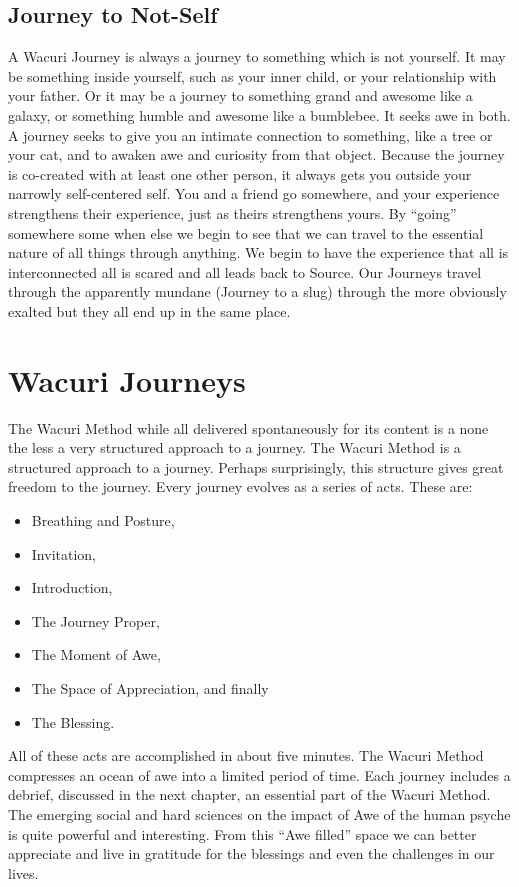 \documentclass[12pt]{book}
\begin{document}
\section{Journey to Not-Self}

A Wacuri Journey is always a journey to something which is not yourself.
It may be something inside yourself, such as your inner child, or your relationship with your father.
Or it may be a journey to something grand and awesome like a galaxy, or something humble and awesome like a bumblebee.
It seeks awe in both. A journey seeks to give you an intimate connection to something, like a tree or your cat,
and to awaken awe and curiosity from that object. Because the journey is co-created with at least one other person,
it always gets you outside your narrowly self-centered self.
You and a friend go somewhere, and your experience strengthens their experience, just as theirs strengthens yours.
 By “going” somewhere some when else we begin to see that we can travel to the essential nature of all things through anything. We begin to have the experience that all is interconnected all is scared and all leads back to Source. Our Journeys travel through the apparently mundane (Journey to a slug) through the more obviously exalted but they all end up in the same place.
				
\chapter{Wacuri Journeys}

The Wacuri Method while all delivered spontaneously for its content is a none the less a very structured approach to a journey.
The Wacuri Method is a structured approach to a journey. Perhaps
surprisingly, this structure gives great freedom to the journey.
Every journey evolves as a series of acts.
These are:
\begin{itemize}
\item Breathing and Posture,
\item Invitation,
\item Introduction,
\item The Journey Proper,
\item The Moment of Awe,
\item The Space of Appreciation, and finally
  \item The  Blessing.
\end{itemize}

All of these acts are accomplished in about five minutes. The Wacuri Method compresses an ocean of awe into a limited period of time. Each journey includes a debrief, discussed in the next chapter, an essential part of the Wacuri Method. The emerging social and hard sciences on the impact of Awe of the human psyche is quite powerful and interesting. From this “Awe filled” space we can better appreciate and live in gratitude for the blessings and even the challenges in our lives.
\end{document}
